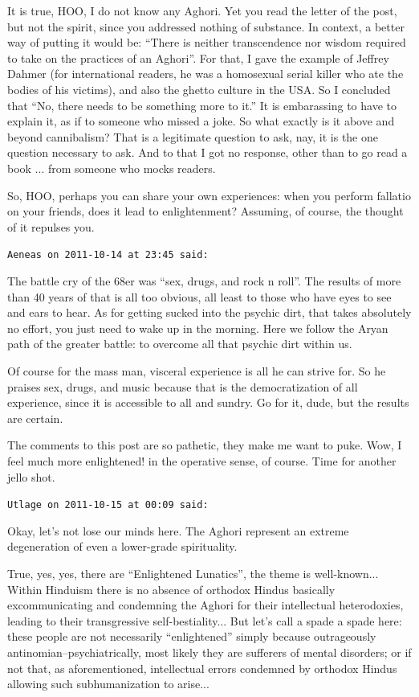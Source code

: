 \begin{footnotesize}
\begin{sffamily}
It is true, HOO, I do not know any Aghori. Yet you read the letter of the post, but not the spirit, since you addressed nothing of substance. In context, a better way of putting it would be: ``There is neither transcendence nor wisdom required to take on the practices of an Aghori''. For that, I gave the example of Jeffrey Dahmer (for international readers, he was a homosexual serial killer who ate the bodies of his victims), and also the ghetto culture in the USA. So I concluded that ``No, there needs to be something more to it.'' It is embarassing to have to explain it, as if to someone who missed a joke. So what exactly is it above and beyond cannibalism? That is a legitimate question to ask, nay, it is the one question necessary to ask. And to that I got no response, other than to go read a book ... from someone who mocks readers.

So, HOO, perhaps you can share your own experiences: when you perform fallatio on your friends, does it lead to enlightenment? Assuming, of course, the thought of it repulses you.

\hfill

\texttt{Aeneas on 2011-10-14 at 23:45 said:}

The battle cry of the 68er was ``sex, drugs, and rock n roll''. The results of more than 40 years of that is all too obvious, all least to those who have eyes to see and ears to hear. As for getting sucked into the psychic dirt, that takes absolutely no effort, you just need to wake up in the morning. Here we follow the Aryan path of the greater battle: to overcome all that psychic dirt within us.

Of course for the mass man, visceral experience is all he can strive for. So he praises sex, drugs, and music because that is the democratization of all experience, since it is accessible to all and sundry. Go for it, dude, but the results are certain.

The comments to this post are so pathetic, they make me want to puke. Wow, I feel much more enlightened! in the operative sense, of course. Time for another jello shot.

\hfill

\texttt{Utlage on 2011-10-15 at 00:09 said:}

Okay, let's not lose our minds here. The Aghori represent an extreme degeneration of even a lower-grade spirituality.

True, yes, yes, there are ``Enlightened Lunatics'', the theme is well-known... Within Hinduism there is no absence of orthodox Hindus basically excommunicating and condemning the Aghori for their intellectual heterodoxies, leading to their transgressive self-bestiality... But let's call a spade a spade here: these people are not necessarily ``enlightened'' simply because outrageously antinomian--psychiatrically, most likely they are sufferers of mental disorders; or if not that, as aforementioned, intellectual errors condemned by orthodox Hindus allowing such subhumanization to arise... 


\end{sffamily}
\end{footnotesize}

